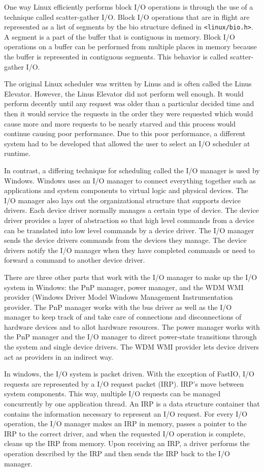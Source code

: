 \documentclass[letterpaper,10pt,onecolumn,draftclsnofoot,]{article}
\begin{document}
One way Linux efficiently performs block I/O operations is through the use of a technique called scatter-gather I/O. Block I/O operations that are in flight are represented as a list of segments by the bio structure defined in \verb|<linux/bio.h>|. A segment is a part of the buffer that is contiguous in memory. Block I/O operations on a buffer can be performed from multiple places in memory because the buffer is represented in contiguous segments. This behavior is called scatter-gather I/O.

The original Linux scheduler was written by Linus and is often called the Linus Elevator. However, the Linus Elevator did not perform well enough. It would perform decently until any request was older than a particular decided time and then it would service the requests in the order they were requested which would cause more and more requests to be nearly starved and this process would continue causing poor performance. Due to this poor performance, a different system had to be developed that allowed the user to select an I/O scheduler at runtime.

In contrast, a differing technique for scheduling called the I/O manager is used by Windows. Windows uses an I/O manager to connect everything together such as applications and system components to virtual logic and physical devices. The I/O manager also lays out the organizational structure that supports device drivers. Each device driver normally manages a certain type of device. The device driver provides a layer of abstraction so that high level commands from a device can be translated into low level commands by a device driver. The I/O manager sends the device drivers commands from the devices they manage. The device drivers notify the I/O manager when they have completed commands or need to forward a command to another device driver.

There are three other parts that work with the I/O manager to make up the I/O system in Windows: the PnP manager, power manager, and the WDM WMI provider (Windows Driver Model Windows Management Instrumentation provider. The PnP manager works with the bus driver as well as the I/O manager to keep track of and take care of connections and disconnections of hardware devices and to allot hardware resources. The power manager works with the PnP manager and the I/O manager to direct power-state transitions through the system and single device drivers. The WDM WMI provider lets device drivers act as providers in an indirect way.

In windows, the I/O system is packet driven. With the exception of FastIO, I/O requests are represented by a I/O request packet (IRP). IRP's move between system components. This way, multiple I/O requests can be managed concurrently by one application thread. An IRP is a data structure container that contains the information necessary to represent an I/O request. For every I/O operation, the I/O manager makes an IRP in memory, passes a pointer to the IRP to the correct driver, and when the requested I/O operation is complete, cleans up the IRP from memory. Upon receiving an IRP, a driver performs the operation described by the IRP and then  sends the IRP back to the I/O manager.
\end{document}
